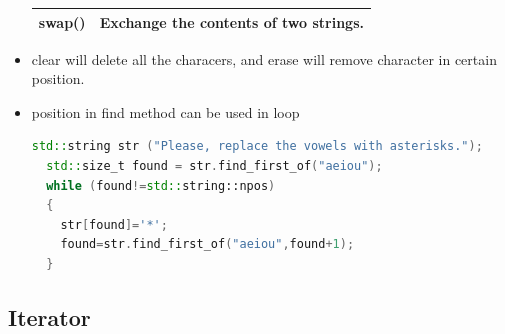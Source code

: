 \documentclass[a4paper,12pt,twoside]{book}
\begin{document}
\begin{itemize}
\begin{tabular}{| p{} |p{}|}
\hline
swap() & Exchange the contents of two strings. \\
\hline
\end{tabular}

\item clear will delete all the characers, and erase will remove character in certain position.

\item position in find method can be used in loop
\begin{lstlisting}[frame=single, language=c++]
std::string str ("Please, replace the vowels with asterisks.");
  std::size_t found = str.find_first_of("aeiou");
  while (found!=std::string::npos)
  {
    str[found]='*';
    found=str.find_first_of("aeiou",found+1);
  }
\end{lstlisting}


\end{itemize}


\subsection{Iterator}
\end{document}
